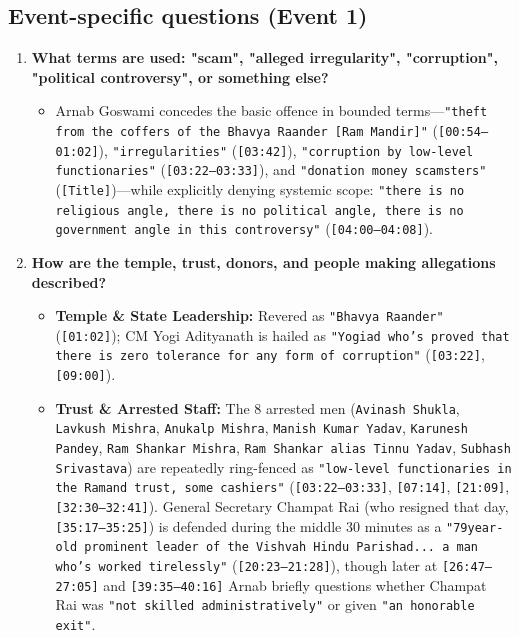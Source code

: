 \documentclass[10pt,a4paper]{article}
\begin{document}
\subsection*{Event-specific questions (Event 1)}
\begin{enumerate}[leftmargin=1.6em, itemsep=4pt, topsep=4pt]
  \item \textbf{What terms are used: "scam", "alleged irregularity", "corruption", "political controversy", or something else?}
  \begin{itemize}[leftmargin=1.4em, itemsep=2pt, topsep=2pt]
    \item Arnab Goswami concedes the basic offence in bounded terms---\texttt{"theft from the coffers of the Bhavya Raander [Ram Mandir]"} (\texttt{[00:54--01:02]}), \texttt{"irregularities"} (\texttt{[03:42]}), \texttt{"corruption by low-level functionaries"} (\texttt{[03:22--03:33]}), and \texttt{"donation money scamsters"} (\texttt{[Title]})---while explicitly denying systemic scope: \texttt{"there is no religious angle, there is no political angle, there is no government angle in this controversy"} (\texttt{[04:00--04:08]}).
  \end{itemize}
  \item \textbf{How are the temple, trust, donors, and people making allegations described?}
  \begin{itemize}[leftmargin=1.4em, itemsep=2pt, topsep=2pt]
    \item \textbf{Temple \& State Leadership:} Revered as \texttt{"Bhavya Raander"} (\texttt{[01:02]}); CM Yogi Adityanath is hailed as \texttt{"Yogiad who's proved that there is zero tolerance for any form of corruption"} (\texttt{[03:22]}, \texttt{[09:00]}).
    \item \textbf{Trust \& Arrested Staff:} The 8 arrested men (\texttt{Avinash Shukla}, \texttt{Lavkush Mishra}, \texttt{Anukalp Mishra}, \texttt{Manish Kumar Yadav}, \texttt{Karunesh Pandey}, \texttt{Ram Shankar Mishra}, \texttt{Ram Shankar alias Tinnu Yadav}, \texttt{Subhash Srivastava}) are repeatedly ring-fenced as \texttt{"low-level functionaries in the Ramand trust, some cashiers"} (\texttt{[03:22--03:33]}, \texttt{[07:14]}, \texttt{[21:09]}, \texttt{[32:30--32:41]}). General Secretary Champat Rai (who resigned that day, \texttt{[35:17--35:25]}) is defended during the middle 30 minutes as a \texttt{"79year-old prominent leader of the Vishvah Hindu Parishad... a man who's worked tirelessly"} (\texttt{[20:23--21:28]}), though later at \texttt{[26:47--27:05]} and \texttt{[39:35--40:16]} Arnab briefly questions whether Champat Rai was \texttt{"not skilled administratively"} or given \texttt{"an honorable exit"}.

\end{itemize}
\end{enumerate}
\end{document}
